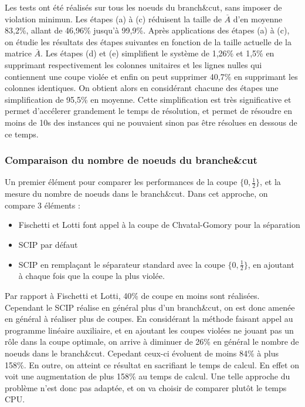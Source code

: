 \documentclass[12pt]{report}
\begin{document}
Les tests ont été réalisés sur tous les noeuds du branch\&cut, sans imposer de violation minimun.
Les étapes (a) à (c) réduisent la taille de $\overset{\_}{A}$ d'en moyenne 83,2\%, allant de 46,96\% jusqu'à 99,9\%.
Après applications des étapes (a) à (c), on étudie les résultats des étapes suivantes en fonction de la taille actuelle de la matrice $\overset{\_}{A}$. Les étapes (d) et (e) simplifient le système de 1,26\% et 1,5\% en supprimant respectivement les colonnes unitaires et les lignes nulles qui contiennent une coupe violée et enfin on peut supprimer 40,7\% en supprimant les colonnes identiques.
On obtient alors en considérant chacune des étapes une simplification de 95,5\% en moyenne.
Cette simplification est très significative et permet d'accélerer grandement le temps de résolution, et permet de résoudre en moins de 10s des instances qui ne pouvaient sinon pas être résolues en dessous de ce temps.

\subsubsection{Comparaison du nombre de noeuds du branche&cut}
Un premier élément pour comparer les performances de la coupe $\{0,\frac{1}{2}\}$, et la mesure du nombre de noeuds dans le branch\&cut. Dans cet approche, on compare 3 éléments :
\begin{itemize}
    \item Fischetti et Lotti font appel à la coupe de Chvatal-Gomory pour la séparation
    \item SCIP par défaut
    \item SCIP en remplaçant le séparateur standard avec la coupe $\{0,\frac{1}{2}\}$, en ajoutant à chaque fois que la coupe la plus violée.
\end{itemize}
Par rapport à Fischetti et Lotti, 40\% de coupe en moins sont réalisées. Cependant le SCIP réalise en général plus d'un branch\&cut, on est donc amenée en général à réaliser plus de coupes.
En considérant la méthode faisant appel au programme linéaire auxiliaire, et en ajoutant les coupes violées ne jouant pas un rôle dans la coupe optimale, on arrive à diminuer de 26\% en général le nombre de noeuds dans le branch\&cut. Cepedant ceux-ci évoluent de moins 84\% à plus 158\%. En outre, on atteint ce résultat en sacrifiant le temps de calcul. En effet on voit une augmentation de plus 158\% au temps de calcul.
Une telle approche du problème n'est donc pas adaptée, et on va choisir de comparer plutôt le temps CPU.
\end{document}
